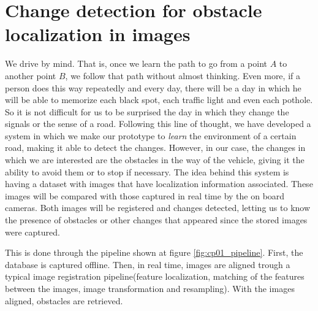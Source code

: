 
\graphicspath{{./images/chapter01/bmps/}{./images/chapter01/vects/}{./images/chapter01/}}

\chapter{Change detection for obstacle localization in images}\label{ch:chapter01}

We drive by mind. That is, once we learn the path to go from a point $A$ to another point $B$, we follow that path without almost thinking. Even more, if a person does this way repeatedly and every day, there will be a day in which he will be able to memorize each black spot, each traffic light and even each pothole. So it is not difficult for us to be surprised the day in which they change the signals or the sense of a road.
Following this line of thought, we have developed a system in which we make our prototype to \emph{learn} the environment of a certain road, making it able to detect the changes. However, in our case, the changes in which we are interested are the obstacles in the way of the vehicle, giving it the ability to avoid them or to stop if necessary. The idea behind this system is having a dataset with images that have localization information associated. These images will be compared with those captured in real time by the on board cameras. Both images will be registered and changes detected, letting us to know the presence of obstacles or other changes that appeared since the stored images were captured.

This is done through the pipeline shown at figure \ref{fig:cp01_pipeline}. First, the database is captured offline. Then, in real time, images are aligned trough a typical image registration pipeline(feature localization, matching of the features between the images, image transformation and resampling). With the images aligned,  obstacles are retrieved.

